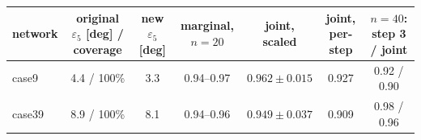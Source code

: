 \begin{tabular}{lcccccc}
\toprule
network & original $\varepsilon_5$ [deg] / coverage & new $\varepsilon_5$ [deg] & marginal, $n=20$ & joint, scaled & joint, per-step & $n=40$: step 3 / joint\\
\midrule
case9 & 4.4 / 100\% & 3.3 & 0.94--0.97 & $0.962\pm0.015$ & 0.927 & 0.92 / 0.90 \\
case39 & 8.9 / 100\% & 8.1 & 0.94--0.96 & $0.949\pm0.037$ & 0.909 & 0.98 / 0.96 \\
\bottomrule
\end{tabular}
